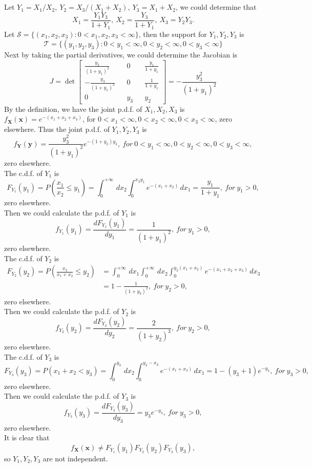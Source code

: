 \documentclass[10.5pt]{article}
\begin{document}
\subsection{}
Let $Y_1=X_1/X_2,~Y_2=X_3/(X_1+X_2),~Y_3=X_1+X_2$, we could determine that $$X_1=\frac{Y_1 Y_3}{1+Y_1},~X_2=\frac{Y_3}{1+Y_1},~X_3=Y_2Y_3.$$\indent
Let $\mathcal{S} = \{(x_1,x_2,x_3):0<x_1,x_2,x_3<\infty\}$, then the support for $Y_1,Y_2,Y_3$ is $$\mathcal{T} = \{(y_1,y_2,y_3):0<y_1<\infty,0<y_2<\infty,0<y_3<\infty\}$$\indent
Next by taking the partial derivatives, we could determine the Jacobian is $$J = \det\begin{bmatrix}
    \frac{y_3}{(1+y_1)^2} & & 0 & & \frac{y_1}{1+y_1}\\
    -\frac{y_3}{(1+y_1)^2} & & 0 & & \frac{1}{1+y_1}\\
    0 & & y_3 & & y_2
\end{bmatrix} = -\frac{y_3^2}{(1+y_1)^2}$$\indent
By the definition, we have the joint p.d.f. of $X_1,X_2,X_3$ is $f_\mathbf{X} (\mathbf{x}) = e^{-(x_1+x_2+x_3)}$, for $0<x_1<\infty,0<x_2<\infty,0<x_3<\infty$, zero elsewhere. Thus the joint p.d.f. of $Y_1,Y_2,Y_3$ is $$f_\mathbf{Y}(\mathbf{y}) = \frac{y_3^2}{(1+y_1)^2}e^{-(1+y_2)y_3},~for ~0<y_1<\infty,0<y_2<\infty,0<y_3<\infty,$$zero elsewhere.\\\indent
The c.d.f. of $Y_1$ is $$F_{Y_1}(y_1) = P\left(\frac{x_1}{x_2} \leqslant y_1\right) = \int_0^{+\infty} \,dx_2 \int_0^{x_2y_1} e^{-(x_1+x_2)} \,dx_1 = \frac{y_1}{1+y_1},~for ~y_1>0,$$zero elsewhere.\\\indent
Then we could calculate the p.d.f. of $Y_1$ is $$f_{Y_1}(y_1) = \frac{d F_{Y_1}(y_1)}{d y_1} = \frac{1}{(1+y_1)^2},~for ~y_1>0,$$zero elsewhere.\\\indent
The c.d.f. of $Y_2$ is $$\begin{aligned}F_{Y_2}(y_2) = P\left(\frac{x_3}{x_1+x_2}\leqslant y_2\right) &= \int_0^{+\infty} \,dx_1 \int_0^{+\infty} \,dx_2 \int_0^{y_2(x_1+x_2)} e^{-(x_1+x_2+x_3)} \,dx_3 \\ &= 1-\frac{1}{(1+y_2)^2},~for ~y_2>0,\end{aligned}$$zero elsewhere.\\\indent
Then we could calculate the p.d.f. of $Y_2$ is $$f_{Y_2}(y_2) = \frac{d F_{Y_2}(y_2)}{d y_2} = \frac{2}{(1+y_2)^3},~for ~y_2>0,$$zero elsewhere.\\\indent
The c.d.f. of $Y_3$ is $$F_{Y_3}(y_3) = P\left(x_1+x_2<y_3\right) = \int_0^{y_3} \,dx_2 \int_0^{y_3-x_2} e^{-(x_1+x_3)} \,dx_1 = 1-(y_3+1)e^{-y_3},~for ~y_3>0,$$zero elsewhere.\\\indent
Then we could calculate the p.d.f. of $Y_3$ is $$f_{Y_3}(y_3) = \frac{d F_{Y_3}(y_3)}{d y_3} = y_3e^{-y_3},~for ~y_3>0,$$zero elsewhere.\\\indent
It is clear that $$f_\mathbf{X} (\mathbf{x}) \neq F_{Y_1}(y_1)F_{Y_2}(y_2)F_{Y_3}(y_3),$$ so $Y_1,Y_2,Y_3$ are not independent.
\end{document}
